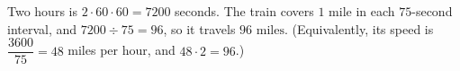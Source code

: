Two hours is $2\cdot60\cdot60=7200$ seconds. The train covers $1$ mile in each $75$-second interval, and $7200\div75=96$, so it travels $\boxed{96\text{ miles}}$. (Equivalently, its speed is $\dfrac{3600}{75}=48$ miles per hour, and $48\cdot2=96$.)
